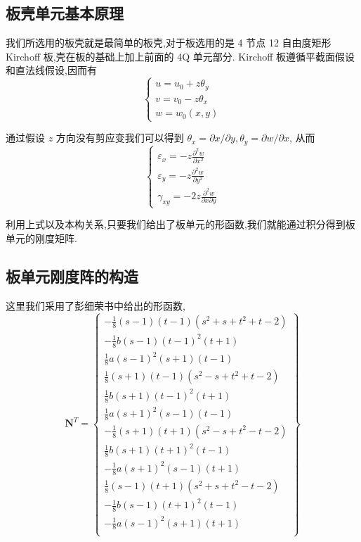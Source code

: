 
\subsection{板壳单元基本原理}
我们所选用的板壳就是最简单的板壳,对于板选用的是 4 节点 12 自由度矩形 Kirchoff 板,壳在板的基础上加上前面的 4Q 单元部分. Kirchoff 板遵循平截面假设和直法线假设,因而有
\[
\left\{ \begin{gathered}
u=u_0+z\theta_y \\
v=v_0-z\theta_x \\
w=w_0(x,y)
\end{gathered} \right.
\]

通过假设 $z$ 方向没有剪应变我们可以得到 $\theta_x=\partial x/\partial y, \theta_y=\partial w/\partial x$, 从而
\[
\left\{ \begin{gathered}
\varepsilon_x = -z\frac{\partial^2 w}{\partial x^2} \\
\varepsilon_y = -z\frac{\partial^2 w}{\partial y^2} \\
\gamma_{xy} = -2z\frac{\partial^2 w}{\partial x \partial y}
\end{gathered} \right.
\]

利用上式以及本构关系,只要我们给出了板单元的形函数,我们就能通过积分得到板单元的刚度矩阵.

\subsection{板单元刚度阵的构造}

这里我们采用了彭细荣书中给出的形函数,
\[ \mathbf{N}^T=\left\{
\begin{array}{c}
-\frac{1}{8}(s-1)(t-1)(s^2+s+t^2+t-2)\\ -\frac{1}{8}b(s-1)(t-1)^2(t+1)\\ \frac{1}{8}a(s-1)^2(s+1)(t-1) \\
\frac{1}{8}(s+1)(t-1)(s^2-s+t^2+t-2) \\ \frac{1}{8}b(s+1)(t-1)^2(t+1) \\ \frac{1}{8}a(s+1)^2(s-1)(t-1) \\
-\frac{1}{8}(s+1)(t+1)(s^2-s+t^2-t-2)\\ \frac{1}{8}b(s+1)(t+1)^2(t-1) \\ -\frac{1}{8}a(s+1)^2(s-1)(t+1) \\
\frac{1}{8}(s-1)(t+1)(s^2+s+t^2-t-2) \\ -\frac{1}{8}b(s-1)(t+1)^2(t-1) \\ -\frac{1}{8}a(s-1)^2(s+1)(t+1) \\
\end{array} \right\} \]

